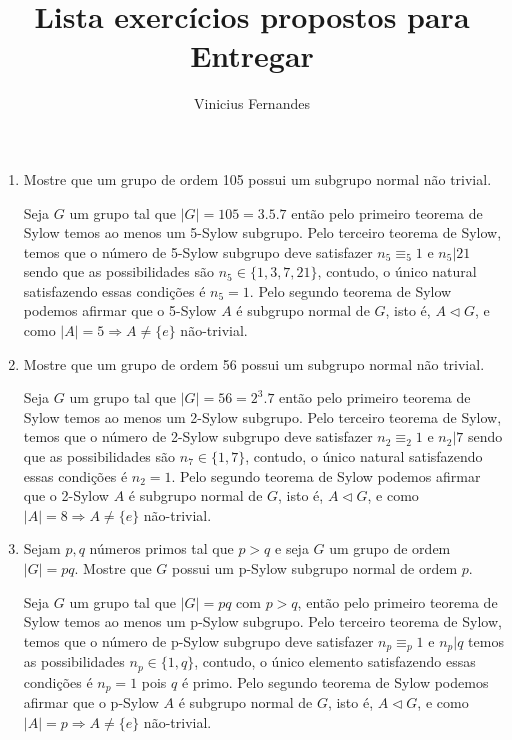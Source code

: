 \documentclass{article}
\begin{document}
	
	\title{Lista exercícios propostos para Entregar}
	\author{Vinicius Fernandes}
	
	\maketitle
	
	\begin{enumerate}
		
		\item Mostre que um grupo de ordem 105 possui um subgrupo normal não trivial.
		
		Seja $G$ um grupo tal que $|G| = 105 = 3.5.7$ então pelo primeiro teorema de Sylow temos ao menos um 5-Sylow subgrupo. Pelo terceiro teorema de Sylow, temos que o número de 5-Sylow subgrupo deve satisfazer $n_{5} \equiv_{5} 1$ e $n_{5} | 21$ sendo que as possibilidades são $n_{5} \in \{1, 3, 7, 21\}$, contudo, o único natural satisfazendo essas condições é $n_{5} = 1$. Pelo segundo teorema de Sylow podemos afirmar que o 5-Sylow $A$ é subgrupo normal de $G$, isto é, $A \vartriangleleft G$, e como $|A| = 5 \Rightarrow A \neq \{e\}$ não-trivial.
		
		\item Mostre que um grupo de ordem 56 possui um subgrupo normal não trivial.
		
		Seja $G$ um grupo tal que $|G| = 56 = 2^{3}.7$ então pelo primeiro teorema de Sylow temos ao menos um 2-Sylow subgrupo. Pelo terceiro teorema de Sylow, temos que o número de 2-Sylow subgrupo deve satisfazer $n_{2} \equiv_{2} 1$ e $n_{2} | 7$ sendo que as possibilidades são $n_{7} \in \{1, 7\}$, contudo, o único natural satisfazendo essas condições é $n_{2} = 1$. Pelo segundo teorema de Sylow podemos afirmar que o 2-Sylow $A$ é subgrupo normal de $G$, isto é, $A \vartriangleleft G$, e como $|A| = 8 \Rightarrow A \neq \{e\}$ não-trivial.
		
		\item Sejam $p,q$ números primos tal que $p>q$ e seja $G$ um grupo de ordem $|G| = pq$. Mostre que $G$ possui um p-Sylow subgrupo normal de ordem $p$.
		
		Seja $G$ um grupo tal que $|G| = pq$ com $p>q$, então pelo primeiro teorema de Sylow temos ao menos um p-Sylow subgrupo. Pelo terceiro teorema de Sylow, temos que o número de p-Sylow subgrupo deve satisfazer $n_{p} \equiv_{p} 1$ e $n_{p} | q$ temos as possibilidades $n_{p} \in \{1, q\}$, contudo, o único elemento satisfazendo essas condições é $n_{p} = 1$ pois $q$ é primo. Pelo segundo teorema de Sylow podemos afirmar que o p-Sylow $A$ é subgrupo normal de $G$, isto é, $A \vartriangleleft G$, e como $|A| = p \Rightarrow A \neq \{e\}$ não-trivial.
		

\end{enumerate}
\end{document}
